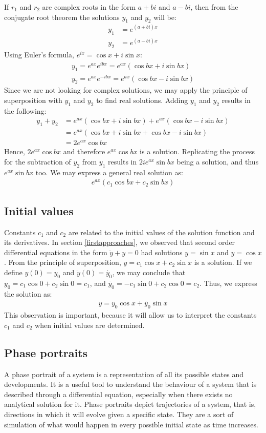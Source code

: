 \documentclass[12pt, a4paper, titlepage]{article}
\theoremstyle{definition}
\numberwithin{equation}{section}
\theoremstyle{definition}
\theoremstyle{definition}
\begin{document}
If $r_1$ and $r_2$ are complex roots in the form $a+bi$ and $a-bi$, then from the conjugate root theorem the solutions $y_1$ and $y_2$ will be:
\begin{align}
y_1&=e^{(a+bi)x}\\
y_2&=e^{(a-bi)x}
\end{align}
Using Euler's formula, $e^{ix}=\cos x+i\sin{x}$:
\begin{align}
y_1=e^{ax}e^{ibx}=e^{ax}(\cos{bx}+i\sin{bx})\\
y_2=e^{ax}e^{-ibx}=e^{ax}(\cos{bx}-i\sin{bx})
\end{align}
Since we are not looking for complex solutions, we may apply the principle of superposition with $y_1$ and $y_2$ to find real solutions. Adding $y_1$ and $y_2$ results in the following:
\begin{align}
y_1+y_2&=e^{ax}(\cos{bx}+i\sin{bx})+e^{ax}(\cos{bx}-i\sin{bx})\\
&=e^{ax}(\cos{bx}+i\sin{bx}+\cos{bx}-i\sin{bx})\\
&=2e^{ax}\cos{bx}
\end{align}
Hence, $2e^{ax}\cos{bx}$ and therefore $e^{ax}\cos{bx}$ is a solution. \parencite{paul} Replicating the process for the subtraction of $y_2$ from $y_1$ results in $2ie^{ax}\sin{bx}$ being a solution, and thus $e^{ax}\sin{bx}$ too. We may express a general real solution as:
\begin{align}
e^{ax}(c_1\cos{bx}+c_2\sin{bx})
\end{align}
\subsection{Initial values}
Constants $c_1$ and $c_2$ are related to the initial values of the solution function and its derivatives. In section \ref{firstapproaches}, we observed that second order differential equations in the form $\ddot{y}+y=0$ had solutions $y=\sin x$ and $y=\cos x$. From the principle of superposition, $y=c_1\cos x+c_2\sin x$ is a solution. If we define $y(0)=y_0$ and $\dot{y}(0)=\dot{y_0}$, we may conclude that $y_0=c_1\cos 0+c_2\sin 0=c_1$, and $\dot{y_0}=-c_1\sin 0+c_2\cos 0=c_2$. Thus, we express the solution as:
\begin{align}
y=y_0\cos x+\dot{y_0}\sin x
\end{align}
This observation is important, because it will allow us to interpret the constants $c_1$ and $c_2$ when initial values are determined.
\subsection{Phase portraits}\label{phase_portraits}
A phase portrait of a system is a representation of all its possible states and developments. It is a useful tool to understand the behaviour of a system that is described through a differential equation, especially when there exists no analytical solution for it. Phase portraits depict trajectories of a system, that is, directions in which it will evolve given a specific state. They are a sort of simulation of what would happen in every possible initial state as time increases.
\end{document}
